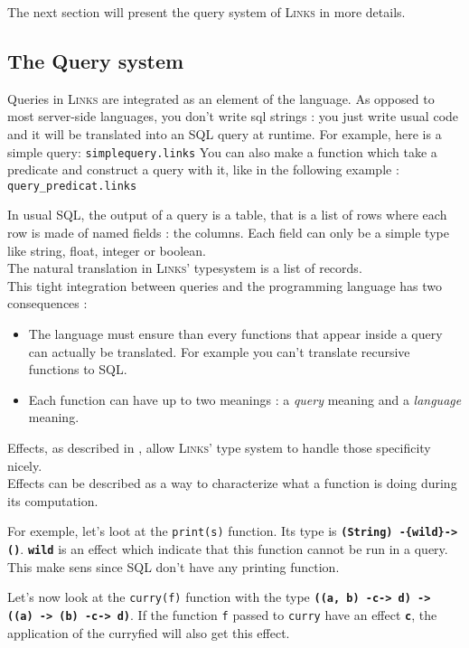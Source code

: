\documentclass[11pt]{article}
\newcommand\mysc[1]{{\rmfamily\textsc{#1}}\xspace}
\newcommand\links{\mysc{Links}}
\newcommand\sql{\mysc{SQL}}
\newcommand\sig[1]{{\tt\bf #1}}
\newcommand\code[1]{{\tt #1}}
\newcommand\linkslst[1]{{\tt #1}}
\newcommand\effect[1]{{\em #1}}
\begin{document}
The next section will present the query system of \links in more details.

\subsection{The Query system\label{intro:query}}

Queries in \links are integrated as an element of the language. As opposed to most server-side languages, you don't write sql strings : you just write usual code and it will be translated into an \sql query at runtime.
For example, here is a simple query: \linkslst{simplequery.links}
You can also make a function which take a predicate and construct a query with it, like in the following example : \linkslst{query_predicat.links}

In usual \sql, the output of a query is a table, that is a list of rows where each row is made of named fields : the columns. Each field can only be a simple type like string, float, integer or boolean.\\
The natural translation in \links' typesystem is a list of records.\\

This tight integration between queries and the programming language has two consequences :
\begin{itemize}
\item The language must ensure than every functions that appear inside a query can actually be translated. For example you can't translate recursive functions to \sql.
\item Each function can have up to two meanings : a \effect{query} meaning and a \effect{language} meaning.
\end{itemize}

Effects, as described in \cite{links:effect}, allow \links' type system to handle those specificity nicely.\\

Effects can be described as a way to characterize what a function is doing during its computation. 

For exemple, let's loot at the \code{print(s)} function. Its type is \sig{(String) -\{wild\}-> ()}. \sig{wild} is an effect which indicate that this function cannot be run in a query. This make sens since \sql don't have any printing function.

Let's now look at the \code{curry(f)} function with the type \sig{((a, b) -c-> d) -> ((a) -> (b) -c-> d)}. If the function \code{f} passed to \code{curry} have an effect \sig{c}, the application of the curryfied will also get this effect.\\
\end{document}
